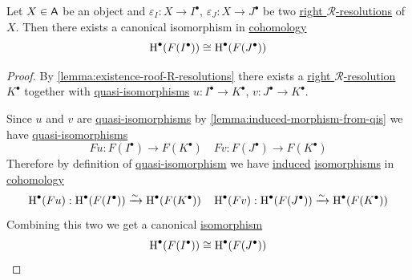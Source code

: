 \documentclass[../../../main]{subfiles}
\begin{document}
\begin{theorem}\label{thm:cohomology-and-R-resolutions}
  Let \(X \in \mathsf{A}\) be an object and \(\varepsilon_{I}: X \to I^{\bullet}\), \(\varepsilon_{J}: X \to J^{\bullet}\) be two \hyperref[def:right-R-resolution]{right \(\mathcal{R}\)-resolutions} of \(X\).
  Then there exists a canonical isomorphism in \hyperref[def:cohomology]{cohomology}
  \begin{equation*}
    \operatorname{H}^{\bullet}(F(I^{\bullet})) \cong \operatorname{H}^{\bullet}(F(J^{\bullet}))
  \end{equation*}
\end{theorem}
\begin{proof}
  By \autoref{lemma:existence-roof-R-resolutions} there exists a \hyperref[def:right-R-resolution]{right \(\mathcal{R}\)-resolution} \(K^{\bullet}\) together with \hyperref[def:quasi-isomorphism]{quasi-isomorphisms} \(u: I^{\bullet} \to K^{\bullet}\), \(v: J^{\bullet} \to K^{\bullet}\).

  Since \(u\) and \(v\) are \hyperref[def:quasi-isomorphism]{quasi-isomorphisms} by \autoref{lemma:induced-morphism-from-qis} we have \hyperref[def:quasi-isomorphism]{quasi-isomorphisms}
  \begin{equation*}
    Fu: F(I^{\bullet}) \to F(K^{\bullet}) \quad Fv: F(J^{\bullet}) \to F(K^{\bullet})
  \end{equation*}
  Therefore by definition of \hyperref[def:quasi-isomorphism]{quasi-isomorphism} we have \hyperref[thm:LES-in-cohomology]{induced} \hyperref[def:categorical-isomorphism]{isomorphisms} in \hyperref[def:cohomology]{cohomology}
  \begin{equation*}
    \operatorname{H}^{\bullet}(Fu): \operatorname{H}^{\bullet}(F(I^{\bullet})) \xrightarrow{\sim} \operatorname{H}^{\bullet}(F(K^{\bullet})) \quad \operatorname{H}^{\bullet}(Fv): \operatorname{H}^{\bullet}(F(J^{\bullet})) \xrightarrow{\sim} \operatorname{H}^{\bullet}(F(K^{\bullet}))
  \end{equation*}
  Combining this two we get a canonical \hyperref[def:categorical-isomorphism]{isomorphism}
  \begin{equation*}
    \operatorname{H}^{\bullet}(F(I^{\bullet})) \cong \operatorname{H}^{\bullet}(F(J^{\bullet}))
  \end{equation*}
\end{proof}
\end{document}
